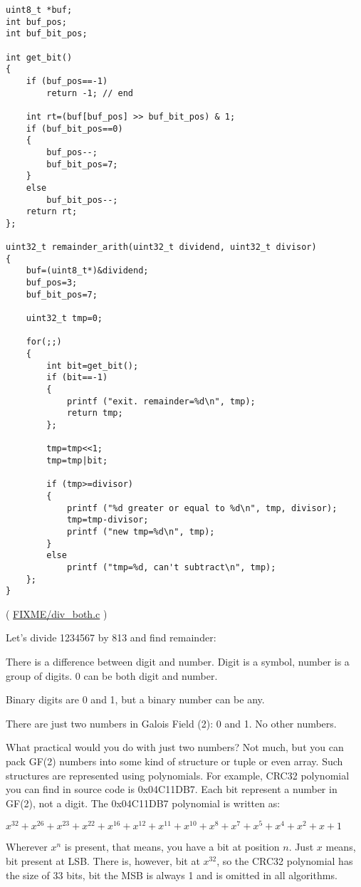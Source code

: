 \begin{lstlisting}[style=customc]
uint8_t *buf;
int buf_pos;
int buf_bit_pos;

int get_bit()
{
	if (buf_pos==-1)
		return -1; // end

	int rt=(buf[buf_pos] >> buf_bit_pos) & 1;
	if (buf_bit_pos==0)
	{
		buf_pos--;
		buf_bit_pos=7;
	}
	else
		buf_bit_pos--;
	return rt;
};

uint32_t remainder_arith(uint32_t dividend, uint32_t divisor)
{
	buf=(uint8_t*)&dividend;
	buf_pos=3;
	buf_bit_pos=7;

	uint32_t tmp=0;

	for(;;)
	{
		int bit=get_bit();
		if (bit==-1)
		{
			printf ("exit. remainder=%d\n", tmp);
			return tmp;
		};

		tmp=tmp<<1;
		tmp=tmp|bit;

		if (tmp>=divisor)
		{
			printf ("%d greater or equal to %d\n", tmp, divisor);
			tmp=tmp-divisor;
			printf ("new tmp=%d\n", tmp);
		}
		else
			printf ("tmp=%d, can't subtract\n", tmp);
	};
}
\end{lstlisting}

( \url{FIXME/div_both.c} )
	
Let's divide 1234567 by 813 and find remainder:




There is a difference between digit and number.
Digit is a symbol, number is a group of digits.
0 can be both digit and number.

Binary digits are 0 and 1, but a binary number can be any.

There are just two numbers in Galois Field (2): 0 and 1.
No other numbers.

What practical would you do with just two numbers?
Not much, but you can pack GF(2) numbers into some kind of structure or tuple or even array.
Such structures are represented using polynomials.
For example, CRC32 polynomial you can find in source code is 0x04C11DB7.
Each bit represent a number in GF(2), not a digit.
The 0x04C11DB7 polynomial is written as: 

$x^{32} + x^{26} + x^{23} + x^{22} + x^{16} + x^{12} + x^{11} + x^{10} + x^8 + x^7 + x^5 + x^4 + x^2 + x + 1$

Wherever $x^n$ is present, that means, you have a bit at position $n$.
Just $x$ means, bit present at LSB.
There is, however, bit at $x^{32}$, so the CRC32 polynomial has the size of 33 bits, bit the \ac{MSB} is always 1 and is
omitted in all algorithms.

